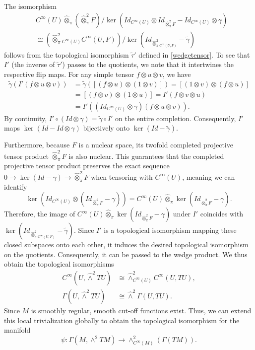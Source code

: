 \documentclass[11pt,reqno]{amsart}
\theoremstyle{definition}
\numberwithin{equation}{section}
\begin{document}
The isomorphism
\begin{align*}
&C^{\infty}(U)\hat{\otimes}_{\pi} (\hat{\otimes}_{\pi}^2 F)/ \ker (Id_{C^\infty(U)} \otimes Id_{\hat{\otimes}_{\pi}^2 F} - Id_{C^\infty(U)} \otimes \gamma) \\
&\cong (\hat{\otimes}_{\pi}^2{}_{C^{\infty}(U)}C^{\infty}(U, F))/ \ker(Id_{\hat{\otimes}_{\pi}^2{}_{C^{\infty}(U, F)}}- \tilde{\gamma})
\end{align*}
follows from the topological isomorphism $\tilde{\tau}'$ defined in \eqref{wedgetensor}. To see that $I'$ (the inverse of $\tilde{\tau}'$) passes to the quotients, we note that it intertwines the respective flip maps. For any simple tensor $f \otimes u \otimes v$, we have
\begin{align*}
\tilde{\gamma}(I'(f \otimes u \otimes v)) &= \tilde{\gamma}([(f \otimes u) \otimes (1 \otimes v)]) = [(1 \otimes v) \otimes (f \otimes u)] \\
&= [(f \otimes v) \otimes (1 \otimes u)] = I'(f \otimes v \otimes u) \\
&= I'( (Id_{C^\infty(U)} \otimes \gamma)(f \otimes u \otimes v) ).
\end{align*}
By continuity, $I' \circ (Id \otimes \gamma) = \tilde{\gamma} \circ I'$ on the entire completion. Consequently, $I'$ maps $\ker(Id - Id \otimes \gamma)$ bijectively onto $\ker(Id - \tilde{\gamma})$.

Furthermore, because $F$ is a nuclear space, its twofold completed projective tensor product $\hat{\otimes}_{\pi}^2 F$ is also nuclear. This guarantees that the completed projective tensor product preserves the exact sequence $0 \rightarrow \ker(Id - \gamma) \rightarrow \hat{\otimes}_{\pi}^2 F$ when tensoring with $C^\infty(U)$, meaning we can identify
\[
\ker (Id_{C^\infty(U)} \otimes (Id_{\hat{\otimes}_{\pi}^2 F} - \gamma)) = C^\infty(U)\hat{\otimes}_\pi\ker(Id_{\hat{\otimes}_{\pi}^2 F}-\gamma).
\]
Therefore, the image of $C^\infty(U)\hat{\otimes}_\pi\ker(Id_{\hat{\otimes}_{\pi}^2 F}-\gamma)$ under $I'$ coincides with $\ker(Id_{\hat{\otimes}_{\pi}^2{}_{C^{\infty}(U, F)}}- \tilde{\gamma})$. Since $I'$ is a topological isomorphism mapping these closed subspaces onto each other, it induces the desired topological isomorphism on the quotients. Consequently, it can be passed to the wedge product. We thus obtain the topological isomorphisms
\begin{align*}
C^{\infty}(U, \hat\wedge^2 TU) &\cong \hat\wedge^2_{C^{\infty}(U)}C^{\infty}(U, TU), \\
\Gamma(U, \hat\wedge^2 TU) &\cong \hat\wedge^2 \Gamma(U, TU). 
\end{align*}
Since $M$ is smoothly regular, smooth cut-off functions exist. Thus, we can extend this local trivialization globally to obtain the topological isomorphism for the manifold
\begin{equation}\label{Iso}
\psi : \Gamma(M, \wedge^2 TM) \rightarrow \wedge^2_{C^{\infty}(M)}(\Gamma(TM)).
\end{equation}
\end{document}
